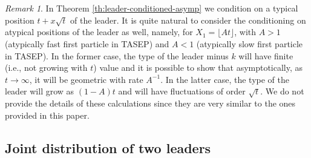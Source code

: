 \documentclass[11pt,reqno]{amsart}
\theoremstyle{definition}
\theoremstyle{remark}
\newtheorem{rmk}[thm]{Remark}
\theoremstyle{remark}
\numberwithin{equation}{section}
\begin{document}
	\begin{rmk}
		In Theorem \ref{th:leader-conditioned-asymp} we condition on a typical position $t + x \sqrt{t}$ of the leader. It is quite natural to consider the conditioning on atypical positions of the leader as well, namely, for $X_1 = \lfloor A t \rfloor$, with $A >1$ (atypically fast first particle in TASEP) and $A<1$ (atypically slow first particle in TASEP). In the former case, the type of the leader minus $k$ will have finite (i.e., not growing with $t$) value and it is possible to show that asymptotically, as $t \to \infty$, it will be geometric with rate $A^{-1}$. In the latter case, the type of the leader will grow as $(1-A)t$ and will have fluctuations of order $\sqrt{t}$. We do not provide the details of these calculations since they are very similar to the ones provided in this paper. 
	\end{rmk}
	
	
	\subsection{Joint distribution of two leaders}
	
\end{document}
